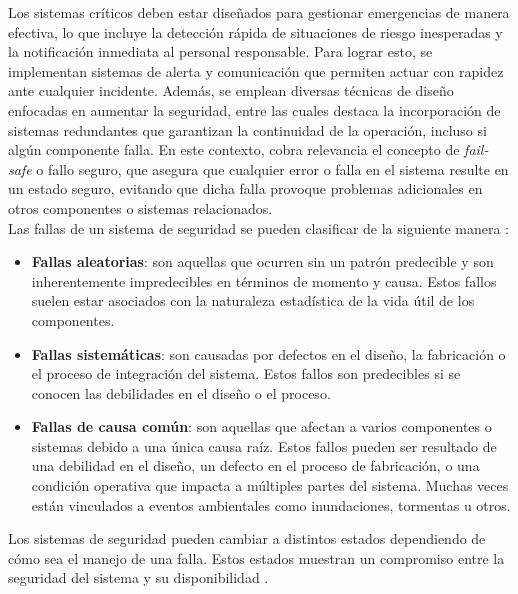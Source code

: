 Los sistemas críticos deben estar diseñados para gestionar emergencias de manera efectiva, lo que incluye la detección rápida de situaciones de riesgo inesperadas y la notificación inmediata al personal responsable. Para lograr esto, se implementan sistemas de alerta y comunicación que permiten actuar con rapidez ante cualquier incidente. Además, se emplean diversas técnicas de diseño enfocadas en aumentar la seguridad, entre las cuales destaca la incorporación de sistemas redundantes que garantizan la continuidad de la operación, incluso si algún componente falla. En este contexto, cobra relevancia el concepto de \textit{fail-safe} o fallo seguro, que asegura que cualquier error o falla en el sistema resulte en un estado seguro, evitando que dicha falla provoque problemas adicionales en otros componentes o sistemas relacionados. \\


Las fallas de un sistema de seguridad se pueden clasificar de la siguiente manera \cite{clasificacion_fallas}: 
\begin{itemize}
    \item \textbf{Fallas aleatorias}: son aquellas que ocurren sin un patrón predecible y son inherentemente impredecibles en términos de momento y causa. Estos fallos suelen estar asociados con la naturaleza estadística de la vida útil de los componentes.
    \item \textbf{Fallas sistemáticas}: son causadas por defectos en el diseño, la fabricación o el proceso de integración del sistema. Estos fallos son predecibles si se conocen las debilidades en el diseño o el proceso.
    \item \textbf{Fallas de causa común}: son aquellas que afectan a varios componentes o sistemas debido a una única causa raíz. Estos fallos pueden ser resultado de una debilidad en el diseño, un defecto en el proceso de fabricación, o una condición operativa que impacta a múltiples partes del sistema. Muchas veces están vinculados a eventos ambientales como inundaciones, tormentas u otros. 
\end{itemize}

Los sistemas de seguridad pueden cambiar a distintos estados dependiendo de cómo sea el manejo de una falla. Estos estados muestran un compromiso entre la seguridad del sistema y su disponibilidad \cite{norma_61508}. 

